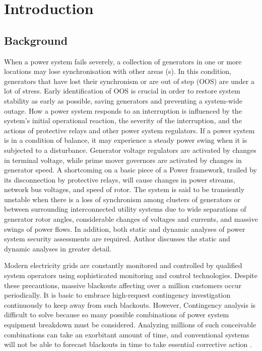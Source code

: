 \chapter{Introduction}
\section{Background} 
When a power system fails severely, a collection of generators in one or more locations may lose synchronisation with other areas (s). In this condition, generators that have lost their synchronism or are out of step (OOS) are under a lot of stress. Early identification of OOS is crucial in order to restore system stability as early as possible, saving generators and preventing a system-wide outage. How a power system responds to an interruption is influenced by the system's initial operational reaction, the severity of the interruption, and the actions of protective relays and other power system regulators. If a power system is in a condition of balance, it may experience a steady power swing when it is subjected to a disturbance. Generator voltage regulators are activated by changes in terminal voltage, while prime mover governors are activated by changes in generator speed. A shortcoming on a basic piece of a Power framework, trailed by its disconnection by protective relays, will cause changes in power streams, network bus voltages, and speed of rotor. The system is said to be transiently unstable when there is a loss of synchronism among clusters of generators or between surrounding interconnected utility systems due to wide separations of generator rotor angles, considerable changes of voltages and currents, and massive swings of power flows. In addition, both static and dynamic analyses of power system security assessments are required. Author \cite{SAPS} discusses the static and dynamic analyses in greater detail. \par

Modern electricity grids are constantly monitored and controlled by qualified system operators using sophisticated monitoring and control technologies. Despite these precautions, massive blackouts affecting over a million customers occur periodically. It is basic to embrace high-request contingency investigation continuously to keep away from such blackouts. However, Contingency analysis is difficult to solve because so many possible combinations of power system equipment breakdown must be considered. Analyzing millions of such conceivable combinations can take an exorbitant amount of time, and conventional systems will not be able to forecast blackouts in time to take essential corrective action \cite{I6}. \par

